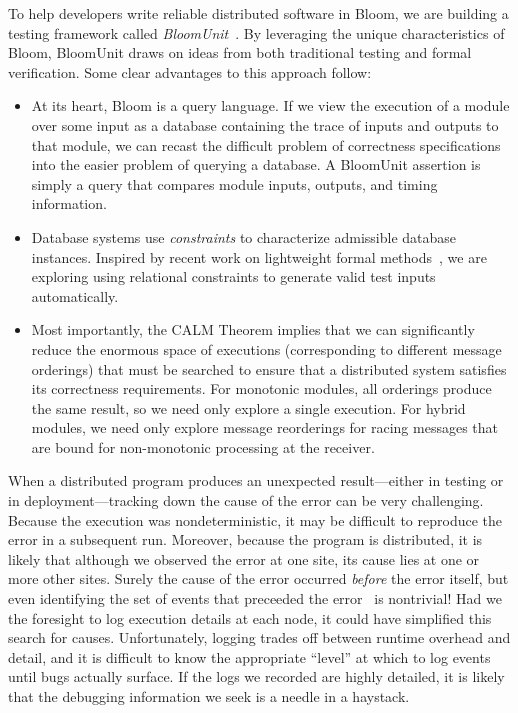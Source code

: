 To help developers write reliable distributed software in Bloom, we are building
a testing framework called \emph{BloomUnit}~\cite{Alvaro2012}. By leveraging the
unique characteristics of Bloom, BloomUnit draws on ideas from both traditional
testing and formal verification. Some clear advantages to this approach follow:

\begin{itemize}
\item
  At its heart, Bloom is a query language.  If we view the execution of a module
  over some input as a database containing the trace of inputs and outputs to
  that module, we can recast the difficult problem of correctness specifications
  into the easier problem of querying a database. A BloomUnit assertion is
  simply a query that compares module inputs, outputs, and timing information.

\item
  Database systems use \emph{constraints} to characterize admissible database
  instances.  Inspired by recent work on lightweight formal
  methods~\cite{Jackson2012}, we are exploring using relational constraints to
  generate valid test inputs automatically.

\item
  Most importantly, the CALM Theorem implies that we can significantly reduce
  the enormous space of executions (corresponding to different message
  orderings) that must be searched to ensure that a distributed system satisfies
  its correctness requirements.  For monotonic modules, all orderings produce
  the same result, so we need only explore a single execution.  For hybrid
  modules, we need only explore message reorderings for racing messages that are
  bound for non-monotonic processing at the receiver.
\end{itemize}

When a distributed program produces an unexpected result---either in testing or in
deployment---tracking down the cause of the error can be very challenging.  Because
the execution was nondeterministic, it may be difficult to reproduce the error in a subsequent
run.  Moreover, because the program is distributed, it is likely that although we observed the 
error at one site, its cause lies at one or more other sites.  Surely the cause of the error
occurred \emph{before} the error itself, but even identifying the set of events that preceeded the 
error~\cite{timeclocks} is nontrivial!  Had we the foresight to log execution details at each node,
it could have simplified this search for causes.  Unfortunately, logging trades off between 
runtime overhead and detail, and it is difficult to know the appropriate ``level'' at which to
log events until bugs actually surface.  If the logs we recorded are highly detailed, it is likely
that the debugging information we seek is a needle in a haystack.

